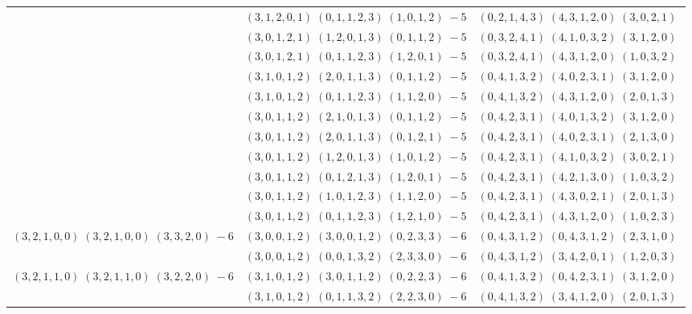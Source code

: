 \documentclass[11pt]{article}
\begin{document}
\begin{longtable}[l]{|c|c|c|}
 \cline{2-3} 
 & $(3 ,1 ,2 ,0 ,1) \;(0 ,1 ,1 ,2 ,3) \;(1 ,0 ,1 ,2) \;-5$ & $(0 ,2 ,1 ,4 ,3) \;(4 ,3 ,1 ,2 ,0) \;(3 ,0 ,2 ,1) \;$\\ 
 \cline{2-3} 
 & $(3 ,0 ,1 ,2 ,1) \;(1 ,2 ,0 ,1 ,3) \;(0 ,1 ,1 ,2) \;-5$ & $(0 ,3 ,2 ,4 ,1) \;(4 ,1 ,0 ,3 ,2) \;(3 ,1 ,2 ,0) \;$\\ 
 \cline{2-3} 
 & $(3 ,0 ,1 ,2 ,1) \;(0 ,1 ,1 ,2 ,3) \;(1 ,2 ,0 ,1) \;-5$ & $(0 ,3 ,2 ,4 ,1) \;(4 ,3 ,1 ,2 ,0) \;(1 ,0 ,3 ,2) \;$\\ 
 \cline{2-3} 
 & $(3 ,1 ,0 ,1 ,2) \;(2 ,0 ,1 ,1 ,3) \;(0 ,1 ,1 ,2) \;-5$ & $(0 ,4 ,1 ,3 ,2) \;(4 ,0 ,2 ,3 ,1) \;(3 ,1 ,2 ,0) \;$\\ 
 \cline{2-3} 
 & $(3 ,1 ,0 ,1 ,2) \;(0 ,1 ,1 ,2 ,3) \;(1 ,1 ,2 ,0) \;-5$ & $(0 ,4 ,1 ,3 ,2) \;(4 ,3 ,1 ,2 ,0) \;(2 ,0 ,1 ,3) \;$\\ 
 \cline{2-3} 
 & $(3 ,0 ,1 ,1 ,2) \;(2 ,1 ,0 ,1 ,3) \;(0 ,1 ,1 ,2) \;-5$ & $(0 ,4 ,2 ,3 ,1) \;(4 ,0 ,1 ,3 ,2) \;(3 ,1 ,2 ,0) \;$\\ 
 \cline{2-3} 
 & $(3 ,0 ,1 ,1 ,2) \;(2 ,0 ,1 ,1 ,3) \;(0 ,1 ,2 ,1) \;-5$ & $(0 ,4 ,2 ,3 ,1) \;(4 ,0 ,2 ,3 ,1) \;(2 ,1 ,3 ,0) \;$\\ 
 \cline{2-3} 
 & $(3 ,0 ,1 ,1 ,2) \;(1 ,2 ,0 ,1 ,3) \;(1 ,0 ,1 ,2) \;-5$ & $(0 ,4 ,2 ,3 ,1) \;(4 ,1 ,0 ,3 ,2) \;(3 ,0 ,2 ,1) \;$\\ 
 \cline{2-3} 
 & $(3 ,0 ,1 ,1 ,2) \;(0 ,1 ,2 ,1 ,3) \;(1 ,2 ,0 ,1) \;-5$ & $(0 ,4 ,2 ,3 ,1) \;(4 ,2 ,1 ,3 ,0) \;(1 ,0 ,3 ,2) \;$\\ 
 \cline{2-3} 
 & $(3 ,0 ,1 ,1 ,2) \;(1 ,0 ,1 ,2 ,3) \;(1 ,1 ,2 ,0) \;-5$ & $(0 ,4 ,2 ,3 ,1) \;(4 ,3 ,0 ,2 ,1) \;(2 ,0 ,1 ,3) \;$\\ 
 \cline{2-3} 
 & $(3 ,0 ,1 ,1 ,2) \;(0 ,1 ,1 ,2 ,3) \;(1 ,2 ,1 ,0) \;-5$ & $(0 ,4 ,2 ,3 ,1) \;(4 ,3 ,1 ,2 ,0) \;(1 ,0 ,2 ,3) \;$\\ \hline\multirow[t]{2}{*}{ $(3 ,2 ,1 ,0 ,0) \;(3 ,2 ,1 ,0 ,0) \;(3 ,3 ,2 ,0) \;-6$ }  & $(3 ,0 ,0 ,1 ,2) \;(3 ,0 ,0 ,1 ,2) \;(0 ,2 ,3 ,3) \;-6$ & $(0 ,4 ,3 ,1 ,2) \;(0 ,4 ,3 ,1 ,2) \;(2 ,3 ,1 ,0) \;$\\ 
 \cline{2-3} 
 & $(3 ,0 ,0 ,1 ,2) \;(0 ,0 ,1 ,3 ,2) \;(2 ,3 ,3 ,0) \;-6$ & $(0 ,4 ,3 ,1 ,2) \;(3 ,4 ,2 ,0 ,1) \;(1 ,2 ,0 ,3) \;$\\ \hline\multirow[t]{7}{*}{ $(3 ,2 ,1 ,1 ,0) \;(3 ,2 ,1 ,1 ,0) \;(3 ,2 ,2 ,0) \;-6$ }  & $(3 ,1 ,0 ,1 ,2) \;(3 ,0 ,1 ,1 ,2) \;(0 ,2 ,2 ,3) \;-6$ & $(0 ,4 ,1 ,3 ,2) \;(0 ,4 ,2 ,3 ,1) \;(3 ,1 ,2 ,0) \;$\\ 
 \cline{2-3} 
 & $(3 ,1 ,0 ,1 ,2) \;(0 ,1 ,1 ,3 ,2) \;(2 ,2 ,3 ,0) \;-6$ & $(0 ,4 ,1 ,3 ,2) \;(3 ,4 ,1 ,2 ,0) \;(2 ,0 ,1 ,3) \;$\\ 

\end{longtable}
\end{document}
